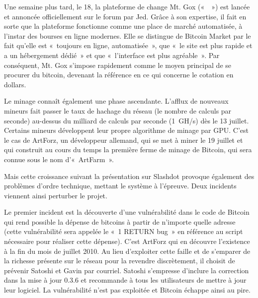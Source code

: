 Une semaine plus tard, le 18, la plateforme de change Mt. Gox («~~») est lancée et annoncée officiellement sur le forum par Jed. Grâce à son expertise, il fait en sorte que la plateforme fonctionne comme une place de marché automatisée, à l'instar des bourses en ligne modernes. Elle se distingue de Bitcoin Market par le fait qu'elle est «~toujours en ligne, automatisée~», que «~le site est plus rapide et a un hébergement dédié~» et que «~l'interface est plus agréable~». Par conséquent, Mt. Gox s'impose rapidement comme le moyen principal de se procurer du bitcoin, devenant la référence en ce qui concerne le cotation en dollars.

Le minage connaît également une phase ascendante. L'afflux de nouveaux mineurs fait passer le taux de hachage du réseau (le nombre de calculs par seconde) au-dessus du milliard de calculs par seconde (1~GH/s) dès le 13 juillet. Certains mineurs développent leur propre algorithme de minage par GPU. C'est le cas de ArtForz, un développeur allemand, qui se met à miner le 19 juillet et qui construit au cours du temps la première ferme de minage de Bitcoin, qui sera connue sous le nom d'«~ArtFarm~».


Mais cette croissance suivant la présentation sur Slashdot provoque également des problèmes d'ordre technique, mettant le système à l'épreuve. Deux incidents viennent ainsi perturber le projet.

Le premier incident est la découverte d'une vulnérabilité dans le code de Bitcoin qui rend possible la dépense de bitcoins à partir de n'importe quelle adresse (cette vulnérabilité sera appelée le «~1 RETURN bug~» en référence au script nécessaire pour réaliser cette dépense). C'est ArtForz qui en découvre l'existence à la fin du mois de juillet 2010. Au lieu d'exploiter cette faille et de s'emparer de la richesse présente sur le réseau pour la revendre discrètement, il choisit de prévenir Satoshi et Gavin par courriel. Satoshi s'empresse d'inclure la correction dans la mise à jour 0.3.6 et recommande à tous les utilisateurs de mettre à jour leur logiciel. La vulnérabilité n'est pas exploitée et Bitcoin échappe ainsi au pire.

